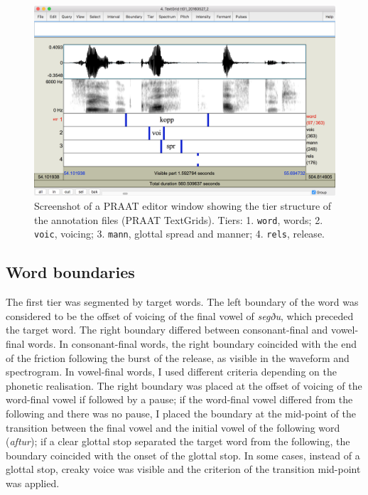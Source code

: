 \documentclass[11pt,a4paper,oneside,openany]{memoir}\usepackage[]{graphicx}\usepackage[]{color}
\begin{document}
\begin{figure}
\centering
\includegraphics[width=\textwidth]{textgrid}
\caption[Structure of annotation files.]{Screenshot of a PRAAT editor window showing the tier structure of the annotation files (PRAAT TextGrids). Tiers: 1. \texttt{word}, words; 2. \texttt{voic}, voicing; 3. \texttt{mann}, glottal spread and manner; 4. \texttt{rels}, release.}
\label{f:textgrid}
\end{figure}

\subsection{Word boundaries}

The first tier was segmented by target words.
The left boundary of the word was considered to be the offset of voicing of the final vowel of \textit{segðu}, which preceded the target word.
The right boundary differed between consonant-final and vowel-final words.
In consonant-final words, the right boundary coincided with the end of the friction following the burst of the release, as visible in the waveform and spectrogram.
In vowel-final words, I used different criteria depending on the phonetic realisation.
The right boundary was placed at the offset of voicing of the word-final vowel if followed by a pause; if the word-final vowel differed from the following and there was no pause, I placed the boundary at the mid-point of the transition between the final vowel and the initial vowel of the following word (\textit{aftur}); if a clear glottal stop separated the target word from the following, the boundary coincided with the onset of the glottal stop.
In some cases, instead of a glottal stop, creaky voice was visible and the criterion of the transition mid-point was applied.
\end{document}
